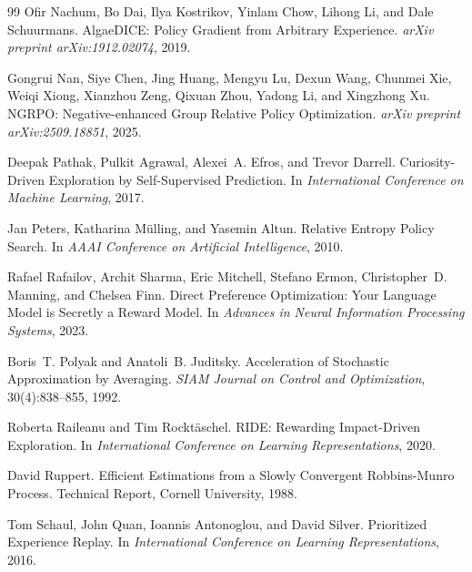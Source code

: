 \documentclass{article}
\begin{document}
\begin{thebibliography}{99}
Ofir Nachum, Bo Dai, Ilya Kostrikov, Yinlam Chow, Lihong Li, and Dale Schuurmans.
\newblock AlgaeDICE: Policy Gradient from Arbitrary Experience.
\newblock \emph{arXiv preprint arXiv:1912.02074}, 2019.

Gongrui Nan, Siye Chen, Jing Huang, Mengyu Lu, Dexun Wang, Chunmei Xie, Weiqi Xiong, Xianzhou Zeng, Qixuan Zhou, Yadong Li, and Xingzhong Xu.
\newblock NGRPO: Negative-enhanced Group Relative Policy Optimization.
\newblock \emph{arXiv preprint arXiv:2509.18851}, 2025.

Deepak Pathak, Pulkit Agrawal, Alexei~A. Efros, and Trevor Darrell.
\newblock Curiosity-Driven Exploration by Self-Supervised Prediction.
\newblock In \emph{International Conference on Machine Learning}, 2017.

Jan Peters, Katharina M\"ulling, and Yasemin Altun.
\newblock Relative Entropy Policy Search.
\newblock In \emph{AAAI Conference on Artificial Intelligence}, 2010.

Rafael Rafailov, Archit Sharma, Eric Mitchell, Stefano Ermon, Christopher~D. Manning, and Chelsea Finn.
\newblock Direct Preference Optimization: Your Language Model is Secretly a Reward Model.
\newblock In \emph{Advances in Neural Information Processing Systems}, 2023.

Boris~T. Polyak and Anatoli~B. Juditsky.
\newblock Acceleration of Stochastic Approximation by Averaging.
\newblock \emph{SIAM Journal on Control and Optimization}, 30(4):838--855, 1992.

Roberta Raileanu and Tim Rockt\"aschel.
\newblock RIDE: Rewarding Impact-Driven Exploration.
\newblock In \emph{International Conference on Learning Representations}, 2020.

David Ruppert.
\newblock Efficient Estimations from a Slowly Convergent Robbins-Munro Process.
\newblock Technical Report, Cornell University, 1988.

Tom Schaul, John Quan, Ioannis Antonoglou, and David Silver.
\newblock Prioritized Experience Replay.
\newblock In \emph{International Conference on Learning Representations}, 2016.


\end{thebibliography}
\end{document}
